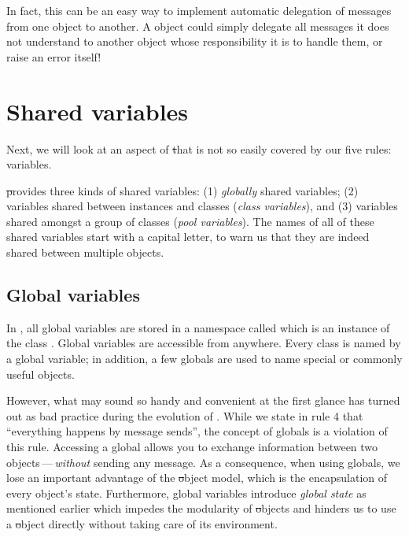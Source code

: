 \documentclass[a4paper,10pt,twoside]{book}
\begin{document}
In fact, this can be an easy way to implement automatic delegation of messages from one object to another.
A  object could simply delegate all messages it does not understand to another object whose responsibility it is to handle them, or raise an error itself!

\section{Shared variables}

Next, we will look at an aspect of \st that is not so easily covered by our five rules:  variables.

\st provides three kinds of shared variables: (1) \emph{globally} shared variables; (2) variables shared between instances and classes (\emph{class variables}), and (3) variables shared amongst a group of  classes (\emph{pool variables}).
The names of all of these shared variables start with a capital letter, to warn us that they are indeed shared between multiple objects.

\subsection{Global variables}
In \squeak, all global variables are stored in a namespace called  which is an instance of the class .
Global variables are accessible from anywhere.
Every class is named by a global variable; in addition, a few globals are used to name special or commonly useful objects.

However, what may sound so handy and convenient at the first glance has turned out as bad practice during the evolution of \sq.
While we state in rule 4 that ``everything happens by message sends'', the concept of globals is a violation of this rule.
Accessing a global allows you to exchange information between two objects\,---\,\emph{without} sending any message.
As a consequence, when using globals, we lose an important advantage of the \st object model, which is the encapsulation of every object's state.
Furthermore, global variables introduce \emph{global state} as mentioned earlier which impedes the modularity of \st objects and hinders us to use a \st object directly without taking care of its environment.
\end{document}
